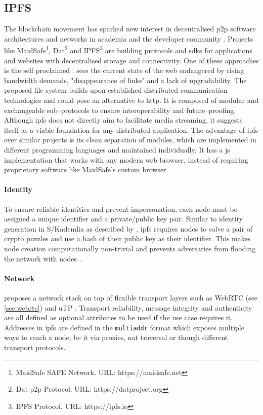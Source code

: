 \subsection{IPFS}\label{chap:IPFS}

The blockchain movement has sparked new interest in decentralised \gls{p2p} software architectures and networks in academia and the developer community \cite{medium-dnets}. Projects like MaidSafe\footnote{MaidSafe SAFE Network. URL: {https://maidsafe.net}}, Dat\footnote{Dat \gls{p2p} Protocol. URL: {https://datproject.org}} and IPFS\footnote{\label{ipfs}IPFS Protocol. URL: {https://ipfs.io}} are building protocols and \glspl{sdk} for applications and websites with decentralised storage and connectivity. One of these approaches is the self proclaimed . \citet[\S1]{ipfs-whitepaper} sees the current state of the web endangered by rising bandwidth demands, "disappearance of links" and a lack of upgradability. The proposed file system builds upon established distributed communication technologies and could pose an alternative to \gls{http}. It is composed of modular and exchangeable sub–protocols to ensure interoperability and future–proofing. Although \gls{ipfs} does not directly aim to facilitate media streaming, it suggests itself as a viable foundation for any distributed application. The advantage of \gls{ipfs} over similar projects is its clean separation of modules, which are implemented in different programming languages and maintained individually. It has a \gls{js} implementation that works with any modern web browser, instead of requiring proprietary software like MaidSafe's custom browser.

\paragraph{Identity}
To ensure reliable identities and prevent impersonation, each node must be assigned a unique identifier and a private/public key pair. Similar to identity generation in S/Kademlia as described by \citet[\S4.1]{s_kademlia}, \gls{ipfs} requires nodes to solve a pair of crypto puzzles and use a hash of their public key as their identifier. This makes node creation computationally non-trivial and prevents adversaries from flooding the network with nodes \cite[\S3.2]{s_kademlia}.

\paragraph{Network}
\citet[\S3.2]{ipfs-whitepaper} proposes a network stack on top of flexible transport layers such as WebRTC (see \vref{sec:webrtc}) and uTP \cite{utp-micro-torrent-transport-protocol}. Transport reliability, message integrity and authenticity are all defined as optional attributes to be used if the use case requires it. Addresses in \gls{ipfs} are defined in the \lstinline|multiaddr| format which exposes multiple ways to reach a node, be it via proxies, \gls{nat} traversal or though different transport protocols.

